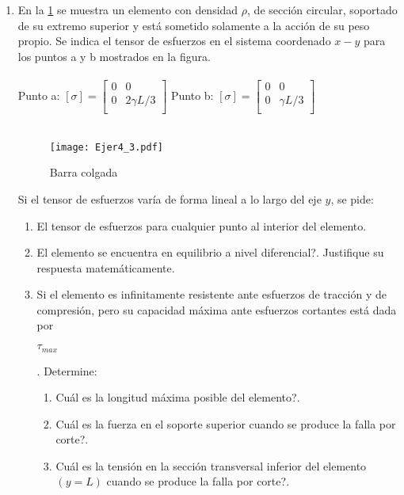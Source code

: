 \documentclass[../notas medios.tex]{subfiles}
\begin{document}
\begin{enumerate}
\item \label{punto03}  En la \cref{barra:colga1} se muestra un elemento
con densidad $\rho$, de secci\'on circular, soportado de su extremo superior y est\'a sometido solamente a la acci\'on de su peso propio. Se indica el tensor de esfuerzos en el sistema coordenado $x-y$ para los puntos a y b mostrados en la figura.\\
	\\
	Punto a: $[\sigma] = \left[ \begin{array}{ccc}
	0 & 0\\ 
	0 & 2 \gamma L/3\\
	\end{array}  \right] $
	\hspace{30mm}
	Punto b: $[\sigma] = \left[ \begin{array}{ccc}
	0 & 0\\ 
	0 & \gamma L/3\\
	\end{array}  \right] $ \\\\
	\begin{figure}[H]
		\centering
		\texttt{[image: Ejer4\_3.pdf]}
		\caption{Barra colgada}
		 \label{barra:colga1}
	\end{figure}
	Si el tensor de esfuerzos var\'ia de forma lineal a lo largo del eje $y$, se pide:
	\begin{enumerate}
		\item El  tensor de esfuerzos para cualquier punto al interior del elemento. 
		\item \textquestiondown El elemento se encuentra en equilibrio a nivel diferencial?. Justifique su respuesta matem\'aticamente.
		\item Si el elemento es infinitamente resistente ante esfuerzos de tracci\'on y de compresi\'on, pero su capacidad m\'axima ante esfuerzos cortantes est\'a dada por \begin{large} $\tau_{max}$ \end{large}. Determine:
		\begin{enumerate} 
			\item \textquestiondown Cu\'al es la longitud m\'axima posible del elemento?. 
			\item  \textquestiondown Cu\'al es la fuerza en el soporte superior cuando se produce la falla por corte?.
			\item \textquestiondown Cu\'al es la tensi\'on en la secci\'on transversal inferior del elemento  $\left( y=L \right)$  cuando se produce la falla por corte?.

\end{enumerate}
\end{enumerate}
\end{enumerate}
\end{document}
